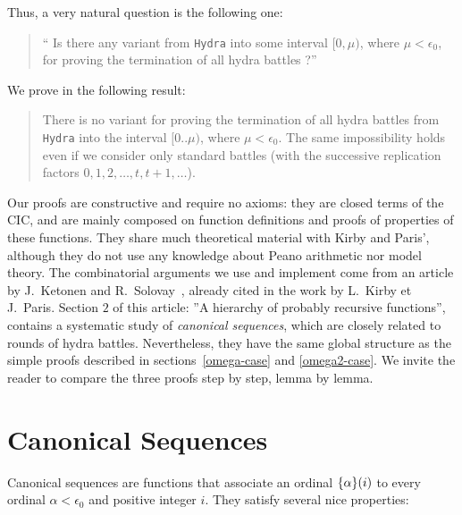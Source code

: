 \documentclass[a4paper]{book}
\begin{document}
Thus, a very natural question is the following one:
\begin{quote}
  `` Is there  any variant from
\texttt{Hydra} into some interval $[0,\mu)$, where $\mu<\epsilon_0$, for proving the termination of all hydra battles ?''
\end{quote}

We prove in \coq{} the following result:

\begin{quote}
There is no variant for proving the termination of all hydra battles
from \texttt{Hydra} into the interval $[0..\mu)$, where
$\mu< \epsilon_0$.
The same impossibility holds even if we consider only standard battles (with the successive replication factors $0,1,2,\dots,t,t+1,\dots$).
\end{quote}

Our proofs are  constructive and require no axioms: they are  closed terms of the CIC, and are mainly composed on function definitions and proofs of properties of these functions. 
They  share much theoretical material with Kirby and Paris', although they do not use any knowledge about Peano arithmetic nor model  theory.  The combinatorial arguments we use and implement
come from 
 an article by J.~Ketonen and R.~Solovay~\cite{KS81}, already  cited in the work
 by L.~Kirby et J.~Paris.%
 Section $2$ of this article: ''A hierarchy of probably recursive functions'', contains a systematic study of \emph{canonical sequences}, which are closely related to
rounds of hydra battles. 
Nevertheless, they have the same global structure as the simple proofs described in
sections~\vref{omega-case} and \vref{omega2-case}. 
We invite the reader to compare the three proofs step by step, lemma by lemma.

\section{Canonical Sequences}
\label{ketonen-solovay-sect}

Canonical sequences are functions that associate an ordinal $\mbox{$\{\alpha\}(i)$}$ to every ordinal $\alpha<\epsilon_0$ and positive integer $i$. They satisfy several nice properties:
\end{document}
